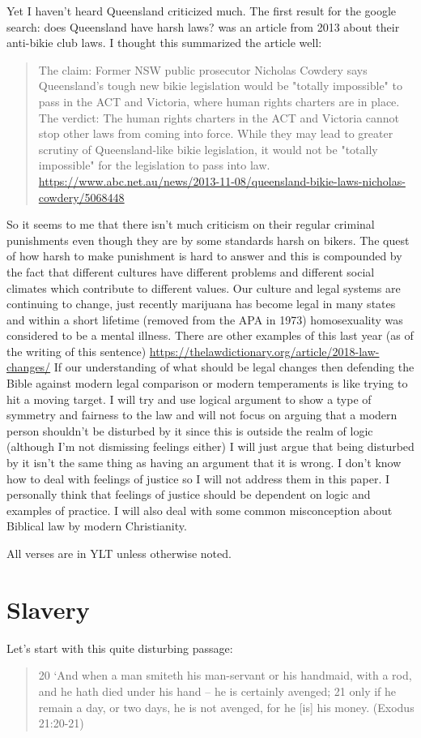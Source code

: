 \documentclass[11pt]{article}
\begin{document}
Yet I haven't heard Queensland criticized much. The first result for the google search: does Queensland have harsh laws? was an article from 2013 about their anti-bikie club laws. I thought this summarized the article well:
\begin{quote}
The claim: Former NSW public prosecutor Nicholas Cowdery says Queensland's tough new bikie legislation would be "totally impossible" to pass in the ACT and Victoria, where human rights charters are in place.
The verdict: The human rights charters in the ACT and Victoria cannot stop other laws from coming into force. While they may lead to greater scrutiny of Queensland-like bikie legislation, it would not be "totally impossible" for the legislation to pass into law. \url{https://www.abc.net.au/news/2013-11-08/queensland-bikie-laws-nicholas-cowdery/5068448}
\end{quote}

So it seems to me that there isn't much criticism on their regular criminal punishments even though they are by some standards harsh on bikers. The quest of how harsh to make punishment is hard to answer and this is compounded by the fact that different cultures have different problems and different social climates which contribute to different values. Our culture and legal systems are continuing to change, just recently marijuana has become legal in many states and within a short lifetime (removed from the APA in 1973) homosexuality was considered to be a mental illness. There are other examples of this last year (as of the writing of this sentence) \url{https://thelawdictionary.org/article/2018-law-changes/} If our understanding of what should be legal changes then defending the Bible against modern legal comparison or modern temperaments is like trying to hit a moving target. I will try and use logical argument to show a type of symmetry and fairness to the law and will not focus on arguing that a modern person shouldn't be disturbed by it since this is outside the realm of logic (although I'm not dismissing feelings either) I will just argue that being disturbed by it isn't the same thing as having an argument that it is wrong. I don't know how to deal with feelings of justice so I will not address them in this paper. I personally think that feelings of justice should be dependent on logic and examples of practice. I will also deal with some common misconception about Biblical law by modern Christianity. 

All verses are in YLT unless otherwise noted.

\section{Slavery}
Let's start with this quite disturbing passage:
\begin{quote}
20 `And when a man smiteth his man-servant or his handmaid, with a rod, and he hath died under his hand -- he is certainly avenged;
21 only if he remain a day, or two days, he is not avenged, for he [is] his money. (Exodus 21:20-21)
\end{quote}
\end{document}
